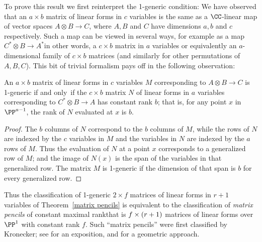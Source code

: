 To prove this result we first reinterpret the 1-generic condition:
We have observed that an
$a\times b$ matrix of linear forms in $c$ variables is the same as a
$\CC$-linear map of vector spaces
$A \otimes B \to C$, where $A, B$ and $C$ have dimensions $a,b$ and $c$
respectively. Such a map
can be viewed in several ways, for example as a map $C^{*} \otimes B\to
A^{*}$\emdash in other words, a $c\times b$ matrix in $a$ variables\emdash
or equivalently an $a$-dimensional family of $c\times b$ matrices (and
similarly for other permutations of $A,B,C$).
This bit of trivial formalism pays off in the following observation:

\begin{proposition}\label{reinterpretation of 1-generic}
An  $a\times b$ matrix of linear forms in $c$ variables $M$ corresponding
to $A\otimes B \to C$ is 1-generic if and only~if the $c \times b$ matrix
$N$ of linear forms in $a$ variables corresponding to $C^{*}\otimes B
\to A$ has constant rank $b$; that is,
for any point $x$ in $\PP^{a-1}$, the rank of $N$ evaluated at $x$ is $b$.
\unif
\end{proposition}

\begin{proof}
The $b$ columns of $N$ correspond to the $b$ columns of $M$, while the
rows of $N$ are indexed
by the $c$ variables in $M$ and the variables in $N$ are indexed by the
$a$ rows of $M$. Thus the
evaluation of $N$ at a point $x$ corresponds to a generalized row of $M$;
and the image of $N(x)$
is the span of the variables in that generalized row. The matrix $M$
is 1-generic if the dimension
of that span is $b$ for every generalized row.
\end{proof}

Thus the classification of 1-generic $2\times f$ matrices of linear
forms in $r+1$ variables of Theorem~\ref{matrix pencils} is equivalent
to the classification
of \emph{matrix pencils} of constant maximal rank\emdash that is $f \times
\index{matrix pencil}%
(r+1)$ matrices of linear forms over $\PP^{1}$ with constant rank $f$.
Such ``matrix pencils'' were first classified by Kronecker; see
%
\cite[Chapter 12]{Gantmacher} for an exposition, and
\cite{Eisenbud-Harris-Centennial} for a geometric approach.

